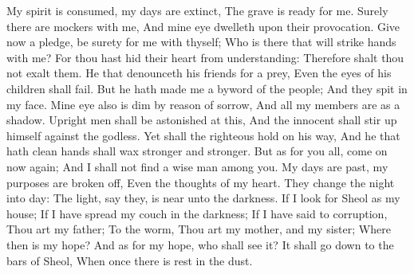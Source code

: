 My spirit is consumed, my days are extinct, The grave is ready for me.  Surely there are mockers with me, And mine eye dwelleth upon their provocation.  Give now a pledge, be surety for me with thyself; Who is there that will strike hands with me?  For thou hast hid their heart from understanding: Therefore shalt thou not exalt them.  He that denounceth his friends for a prey, Even the eyes of his children shall fail.  But he hath made me a byword of the people; And they spit in my face.  Mine eye also is dim by reason of sorrow, And all my members are as a shadow.  Upright men shall be astonished at this, And the innocent shall stir up himself against the godless.  Yet shall the righteous hold on his way, And he that hath clean hands shall wax stronger and stronger.  But as for you all, come on now again; And I shall not find a wise man among you.  My days are past, my purposes are broken off, Even the thoughts of my heart.  They change the night into day: The light, say they, is near unto the darkness.  If I look for Sheol as my house; If I have spread my couch in the darkness;  If I have said to corruption, Thou art my father; To the worm, Thou art my mother, and my sister;  Where then is my hope? And as for my hope, who shall see it?  It shall go down to the bars of Sheol, When once there is rest in the dust. 

